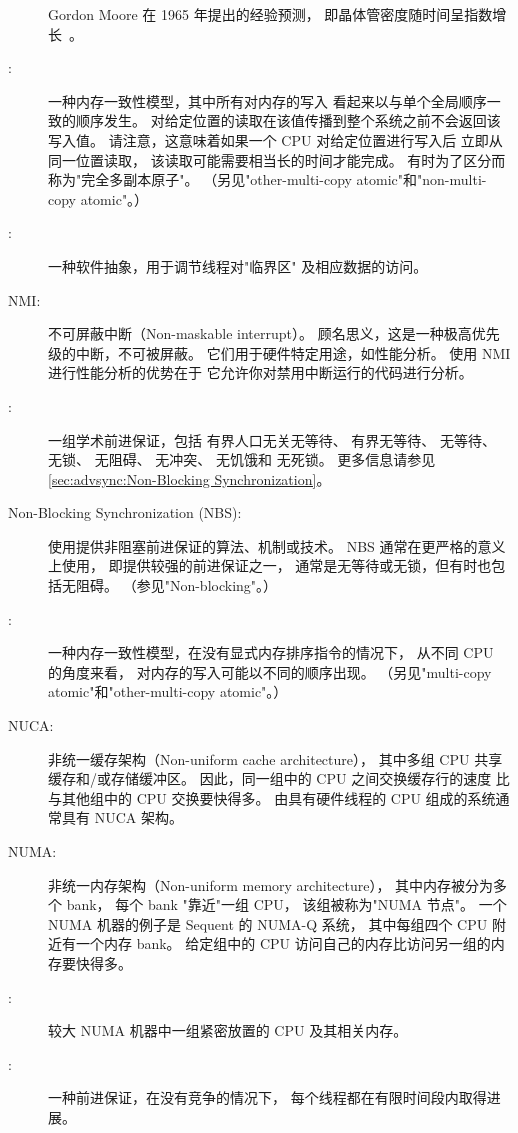 \begin{description}
	Gordon Moore 在 1965 年提出的经验预测，
	即晶体管密度随时间呈指数增长~\cite{GordonMoore1965MooresLaw}。
\item[\IXG{Multi-Copy Atomic}:]
	一种内存一致性模型，其中所有对内存的写入
	看起来以与单个全局顺序一致的顺序发生。
	对给定位置的读取在该值传播到整个系统之前不会返回该写入值。
	请注意，这意味着如果一个 CPU 对给定位置进行写入后
	立即从同一位置读取，
	该读取可能需要相当长的时间才能完成。
	有时为了区分而称为"完全多副本原子"。
	（另见"other-multi-copy atomic"和"non-multi-copy atomic"。）
\item[\IXG{Mutual-Exclusion Mechanism}:]
	一种软件抽象，用于调节线程对"临界区"
	及相应数据的访问。
\item[NMI:]
	不可屏蔽中断（Non-maskable interrupt）。
	顾名思义，这是一种极高优先级的中断，不可被屏蔽。
	它们用于硬件特定用途，如性能分析。
	使用 NMI 进行性能分析的优势在于
	它允许你对禁用中断运行的代码进行分析。
\item[\IXG{Non-Blocking}:]
	一组学术前进保证，包括
	有界人口无关无等待、
	有界无等待、
	无等待、
	无锁、
	无阻碍、
	无冲突、
	无饥饿和
	无死锁。
	更多信息请参见 \cref{sec:advsync:Non-Blocking Synchronization}。
\item[Non-Blocking Synchronization (NBS):]
	使用提供非阻塞前进保证的算法、机制或技术。
	NBS 通常在更严格的意义上使用，
	即提供较强的前进保证之一，
	通常是无等待或无锁，但有时也包括无阻碍。
	（参见"Non-blocking"。）
\item[\IXGhy{Non-}{Multi-Copy Atomic}:]
	一种内存一致性模型，在没有显式内存排序指令的情况下，
	从不同 CPU 的角度来看，
	对内存的写入可能以不同的顺序出现。
	（另见"multi-copy atomic"和"other-multi-copy atomic"。）
\item[NUCA:]
	非统一缓存架构（Non-uniform cache architecture），
	其中多组 CPU 共享缓存和/或存储缓冲区。
	因此，同一组中的 CPU 之间交换缓存行的速度
	比与其他组中的 CPU 交换要快得多。
	由具有硬件线程的 CPU 组成的系统通常具有 NUCA 架构。
\item[NUMA:]
	非统一内存架构（Non-uniform memory architecture），
	其中内存被分为多个 bank，
	每个 bank "靠近"一组 CPU，
	该组被称为"NUMA 节点"。
	一个 NUMA 机器的例子是 Sequent 的 NUMA-Q 系统，
	其中每组四个 CPU 附近有一个内存 bank。
	给定组中的 CPU 访问自己的内存比访问另一组的内存要快得多。
\item[\IXGaltr{NUMA Node}{NUMA node}:]
	较大 NUMA 机器中一组紧密放置的 CPU 及其相关内存。
\item[\IXG{Obstruction Free}:]
	一种前进保证，在没有竞争的情况下，
	每个线程都在有限时间段内取得进展。

\end{description}
